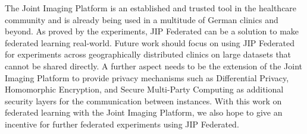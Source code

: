 The Joint Imaging Platform is an established and trusted tool in the healthcare community and is already being used in a multitude of German clinics and beyond.
As proved by the experiments, JIP Federated can be a solution to make federated learning real-world.
Future work should focus on using JIP Federated for experiments across  geographically distributed clinics on large datasets that cannot be shared directly.
A further aspect needs to be the extension of the Joint Imaging Platform to provide privacy mechanisms such as Differential Privacy, Homomorphic Encryption, and Secure Multi-Party Computing as additional security layers for the communication between instances.
With this work on federated learning with the Joint Imaging Platform, we also hope to give an incentive for further federated experiments using JIP Federated.
